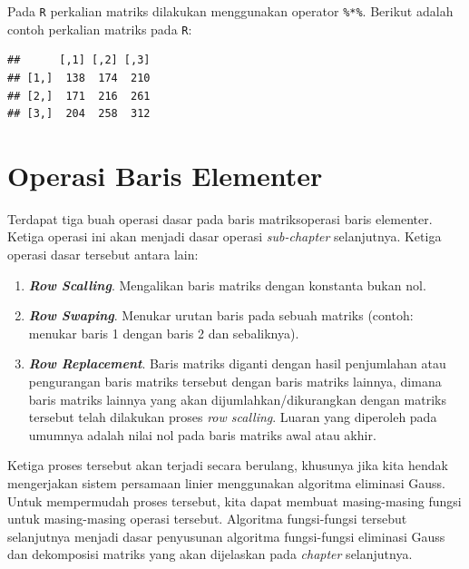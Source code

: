 \documentclass[]{book}
\newenvironment{Shaded}{\begin{snugshade}}{\end{snugshade}}
\newcommand{\CommentTok}[1]{\textcolor[rgb]{0.56,0.35,0.01}{\textit{#1}}}
\newcommand{\NormalTok}[1]{#1}
\newcommand{\OperatorTok}[1]{\textcolor[rgb]{0.81,0.36,0.00}{\textbf{#1}}}
\providecommand{\tightlist}{%
  \setlength{\itemsep}{0pt}\setlength{\parskip}{0pt}}
\theoremstyle{definition}
\theoremstyle{definition}
\theoremstyle{definition}
\theoremstyle{remark}
\begin{document}
Pada \texttt{R} perkalian matriks dilakukan menggunakan operator \texttt{\%*\%}. Berikut adalah contoh perkalian matriks pada \texttt{R}:

\begin{Shaded}
\end{Shaded}

\begin{verbatim}
##      [,1] [,2] [,3]
## [1,]  138  174  210
## [2,]  171  216  261
## [3,]  204  258  312
\end{verbatim}

\hypertarget{rowoperation}{%
\section{Operasi Baris Elementer}\label{rowoperation}}

Terdapat tiga buah operasi dasar pada baris matriksoperasi baris elementer. Ketiga operasi ini akan menjadi dasar operasi \emph{sub-chapter} selanjutnya. Ketiga operasi dasar tersebut antara lain:

\begin{enumerate}
\def\labelenumi{\arabic{enumi}.}
\tightlist
\item
  \textbf{\emph{Row Scalling}}. Mengalikan baris matriks dengan konstanta bukan nol.
\item
  \textbf{\emph{Row Swaping}}. Menukar urutan baris pada sebuah matriks (contoh: menukar baris 1 dengan baris 2 dan sebaliknya).
\item
  \textbf{\emph{Row Replacement}}. Baris matriks diganti dengan hasil penjumlahan atau pengurangan baris matriks tersebut dengan baris matriks lainnya, dimana baris matriks lainnya yang akan dijumlahkan/dikurangkan dengan matriks tersebut telah dilakukan proses \emph{row scalling}. Luaran yang diperoleh pada umumnya adalah nilai nol pada baris matriks awal atau akhir.
\end{enumerate}

Ketiga proses tersebut akan terjadi secara berulang, khusunya jika kita hendak mengerjakan sistem persamaan linier menggunakan algoritma eliminasi Gauss. Untuk mempermudah proses tersebut, kita dapat membuat masing-masing fungsi untuk masing-masing operasi tersebut. Algoritma fungsi-fungsi tersebut selanjutnya menjadi dasar penyusunan algoritma fungsi-fungsi eliminasi Gauss dan dekomposisi matriks yang akan dijelaskan pada \emph{chapter} selanjutnya.
\end{document}
